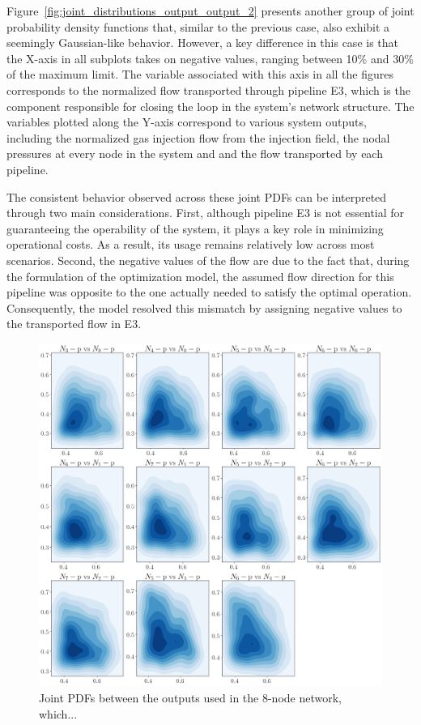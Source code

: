 Figure~\ref{fig:joint_distributions_output_output_2} presents another group of joint probability density functions that, similar to the previous case, also exhibit a seemingly Gaussian-like behavior. However, a key difference in this case is that the X-axis in all subplots takes on negative values, ranging between 10\% and 30\% of the maximum limit. The variable associated with this axis in all the figures corresponds to the normalized flow transported through pipeline E3, which is the component responsible for closing the loop in the system’s network structure.
The variables plotted along the Y-axis correspond to various system outputs, including the normalized gas injection flow from the injection field, the nodal pressures at every node in the system and and the flow transported by each pipeline.

The consistent behavior observed across these joint PDFs can be interpreted through two main considerations. First, although pipeline E3 is not essential for guaranteeing the operability of the system, it plays a key role in minimizing operational costs. As a result, its usage remains relatively low across most scenarios. Second, the negative values of the flow are due to the fact that, during the formulation of the optimization model, the assumed flow direction for this pipeline was opposite to the one actually needed to satisfy the optimal operation. Consequently, the model resolved this mismatch by assigning negative values to the transported flow in E3.


\begin{figure}
    \begin{center}
        \includegraphics[width=.7\textwidth]{figures/Chapter_NonLinealCensnet/outputs_outputs_3.png}
    \end{center}
    \caption{Joint PDFs between the outputs used in the 8-node network, which... }
    \label{fig:joint_distributions_output_output_3}
\end{figure}
 


